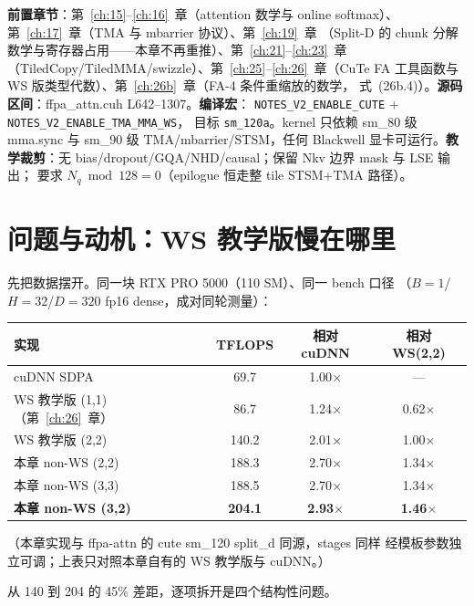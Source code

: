 \textbf{前置章节}：第~\ref{ch:15}--\ref{ch:16}~章（attention 数学与 online
softmax）、第~\ref{ch:17}~章（TMA 与 mbarrier 协议）、第~\ref{ch:19}~章
（Split-D 的 chunk 分解数学与寄存器占用——本章不再重推）、第~\ref{ch:21}--\ref{ch:23}~章
（TiledCopy/TiledMMA/swizzle）、第~\ref{ch:25}--\ref{ch:26}~章（CuTe FA
工具函数与 WS 版类型代数）、第~\ref{ch:26b}~章（FA-4 条件重缩放的数学，
式~(26b.4)）。\textbf{源码区间}：ffpa\_attn.cuh L642--1307。\textbf{编译宏}：
\texttt{NOTES\_\allowbreak{}V2\_\allowbreak{}ENABLE\_\allowbreak{}CUTE} +
\texttt{NOTES\_\allowbreak{}V2\_\allowbreak{}ENABLE\_\allowbreak{}TMA\_\allowbreak{}MMA\_\allowbreak{}WS}，
目标 \texttt{sm\_120a}。kernel 只依赖 sm\_80 级 mma.sync 与 sm\_90 级
TMA/mbarrier/STSM，任何 Blackwell 显卡可运行。\textbf{教学裁剪}：无
bias/dropout/GQA/NHD/causal；保留 Nkv 边界 mask 与 LSE 输出；
要求 $N_q \bmod 128 = 0$（epilogue 恒走整 tile STSM+TMA 路径）。

\section{问题与动机：WS 教学版慢在哪里}\label{sec:26c-motivation}

先把数据摆开。同一块 RTX PRO 5000（110 SM）、同一 bench 口径
（$B{=}1$/$H{=}32$/$D{=}320$ fp16 dense，成对同轮测量）：

\begin{center}
\begin{tabular}{lccc}
\toprule
实现 & TFLOPS & 相对 cuDNN & 相对 WS(2,2) \\
\midrule
cuDNN SDPA & 69.7 & 1.00$\times$ & --- \\
WS 教学版 (1,1)（第~\ref{ch:26}~章） & 86.7 & 1.24$\times$ & 0.62$\times$ \\
WS 教学版 (2,2) & 140.2 & 2.01$\times$ & 1.00$\times$ \\
本章 non-WS (2,2) & 188.3 & 2.70$\times$ & 1.34$\times$ \\
本章 non-WS (3,3) & 188.5 & 2.70$\times$ & 1.34$\times$ \\
\textbf{本章 non-WS (3,2)} & \textbf{204.1} & \textbf{2.93$\times$} & \textbf{1.46$\times$} \\
\bottomrule
\end{tabular}
\end{center}

（本章实现与 ffpa-attn 的 cute sm\_120 split\_d 同源，stages 同样
经模板参数独立可调；上表只对照本章自有的 WS 教学版与 cuDNN。）

从 140 到 204 的 45\% 差距，逐项拆开是四个结构性问题。

